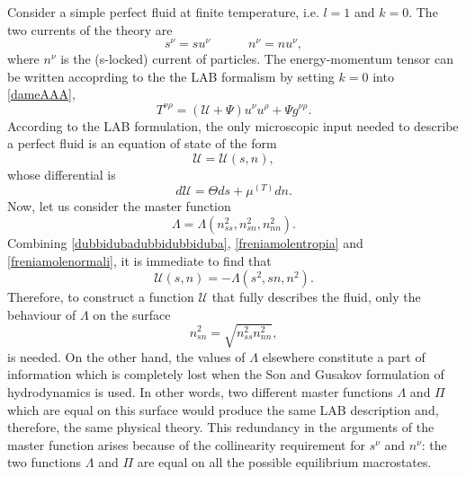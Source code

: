 \documentclass[usenatbib]{mnras}
\newcommand{\spc}{\quad \quad \quad}
\begin{document}
Consider a simple perfect fluid at finite temperature, i.e. $l=1$ and $k=0$. 
The two currents of the theory are
%
\begin{equation}\label{1234}
s^\nu = s u^\nu  \spc  n^\nu = n u^\nu,
\end{equation}  
%
where $n^\nu$ is the (s-locked) current of particles. The energy-momentum tensor can be written accoprding to the  the LAB formalism by setting $k=0$ into \eqref{dameAAA},
%
\begin{equation}\label{5678}
T^{\nu \rho} = (\mathcal{U} + \Psi) u^\nu u^\rho + \Psi g^{\nu \rho}.
\end{equation}
%
According to the LAB formulation, the only microscopic input needed to describe a perfect fluid is an equation of state of the form
%
\begin{equation}
\mathcal{U} = \mathcal{U}(s,n),
\end{equation}
%
whose differential is
%
\begin{equation}
d\mathcal{U} = \Theta ds + \mu^{(T)}dn.
\end{equation}
%
Now, let us consider the master function 
%
\begin{equation}
\Lambda = \Lambda (n_{ss}^2,n_{sn}^2,n_{nn}^2).
\end{equation}
%
Combining \eqref{dubbidubadubbidubbiduba}, \eqref{freniamolentropia} and \eqref{freniamolenormali}, it is immediate to find that
%
\begin{equation}
\mathcal{U}(s,n) = -\Lambda (s^2,sn,n^2).
\end{equation}
%
Therefore, to construct a function $\mathcal{U}$ that fully describes the fluid, only the behaviour of $\Lambda$ on the surface
%
\begin{equation}\label{9012}
n_{sn}^2 = \sqrt{n_{ss}^2 n_{nn}^2},
\end{equation} 
%
is needed. On the other hand, the values of $\Lambda$ elsewhere constitute a part of information which is completely lost when the Son and Gusakov formulation of hydrodynamics is used. In other words, two different master functions $\Lambda$ and $\Pi$ which are equal on this surface would produce the same LAB description and, therefore, the same physical theory. 
This redundancy in the arguments of the master function arises because of the collinearity requirement for $s^\nu$ and $n^\nu$: the two functions $\Lambda$ and $\Pi$ are equal on all the possible equilibrium macrostates.
\end{document}
